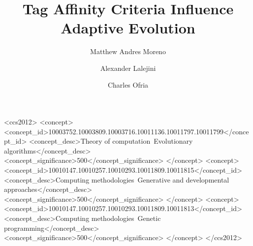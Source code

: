 \documentclass[dvipsnames,format=sigconf]{acmart}
\begin{document}
\title{Tag Affinity Criteria Influence Adaptive Evolution}

\author{Matthew Andres Moreno}

\author{Alexander Lalejini}

\author{Charles Ofria}

\renewcommand{\shortauthors}{Moreno et al.}





\begin{CCSXML}
<ccs2012>
   <concept>
       <concept_id>10003752.10003809.10003716.10011136.10011797.10011799</concept_id>
       <concept_desc>Theory of computation~Evolutionary algorithms</concept_desc>
       <concept_significance>500</concept_significance>
       </concept>
   <concept>
       <concept_id>10010147.10010257.10010293.10011809.10011815</concept_id>
       <concept_desc>Computing methodologies~Generative and developmental approaches</concept_desc>
       <concept_significance>500</concept_significance>
       </concept>
   <concept>
       <concept_id>10010147.10010257.10010293.10011809.10011813</concept_id>
       <concept_desc>Computing methodologies~Genetic programming</concept_desc>
       <concept_significance>500</concept_significance>
       </concept>
 </ccs2012>
\end{CCSXML}
\end{document}
